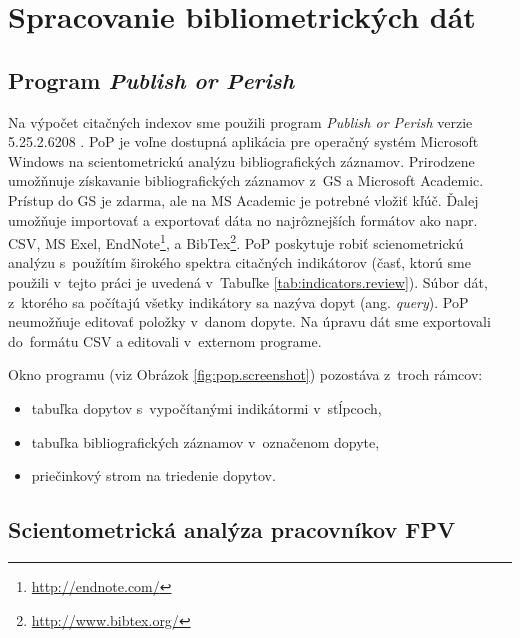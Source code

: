 \section{Spracovanie bibliometrických dát}

\subsection{Program \emph{Publish or Perish}}
\label{sec:pop}

Na výpočet citačných indexov sme použili program \emph{Publish or Perish} verzie
5.25.2.6208 \citep{Harzing2011}.  PoP je voľne dostupná aplikácia pre operačný
systém Microsoft Windows na scientometrickú analýzu bibliografických záznamov.
Prirodzene umožňnuje získavanie bibliografických záznamov z~GS a Microsoft
Academic. Prístup do GS je zdarma, ale na MS Academic je potrebné vložiť kľúč.
Ďalej umožňuje importovať a exportovať dáta no najrôznejších formátov ako napr.
CSV, MS Exel, EndNote\footnote{\url{http://endnote.com/}}, a
BibTex\footnote{\url{http://www.bibtex.org/}}.  PoP poskytuje robiť scienometrickú
analýzu s~použítím širokého spektra citačných indikátorov (časť, ktorú sme použili
v~tejto práci je uvedená v~Tabuľke \ref{tab:indicators.review}).
Súbor dát, z~ktorého sa počítajú všetky indikátory sa nazýva dopyt (ang. \emph{query}).
PoP neumožňuje editovať položky v~danom dopyte. Na úpravu dát sme exportovali
do~formátu CSV a editovali v~externom programe.

Okno programu (viz Obrázok
\ref{fig:pop.screenshot}) pozostáva z~troch rámcov: 
\begin{itemize}
  \item tabuľka dopytov s~vypočítanými indikátormi v~stĺpcoch, 
  \item tabuľka bibliografických záznamov v~označenom dopyte,
  \item priečinkový strom na triedenie dopytov.
\end{itemize}

\subsection{Scientometrická analýza pracovníkov FPV}

